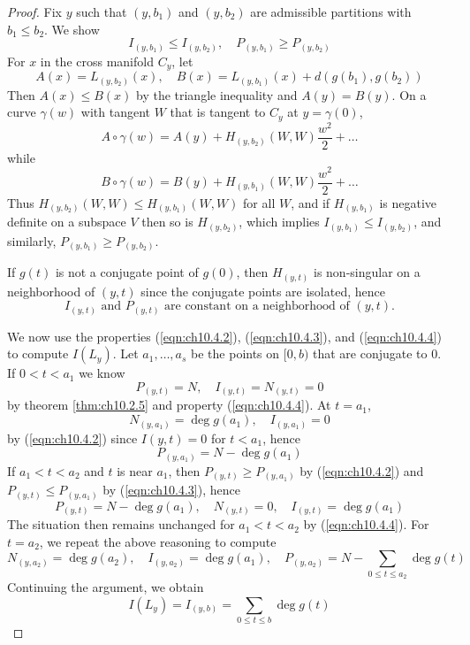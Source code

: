 \documentclass[../main]{subfiles}
\begin{document}
\begin{proof}
Fix $y$ such that $(y,b_1)$ and $(y,b_2)$ are admissible partitions with $b_1\le b_2$. We show
\begin{equation} \tag{12}\label{eqn:ch10.4.3}
I_{(y,b_1)} \le I_{(y,b_2)},
\quad P_{(y,b_1)} \ge P_{(y,b_2)}
\end{equation}
For $x$ in the cross manifold $C_y$, let
\[A(x) = L_{(y,b_2)}(x),
\quad B(x) = L_{(y,b_1)}(x) + d(g(b_1),g(b_2))\]
Then $A(x)\le B(x)$ by the triangle inequality and $A(y)=B(y)$. On a curve $\gamma(w)$ with tangent $W$ that is tangent to $C_y$ at $y=\gamma(0)$,
\[A\circ\gamma(w) = A(y) + H_{(y,b_2)}(W,W)\frac{w^2}{2} + \ldots\]
while
\[B\circ\gamma(w) = B(y) + H_{(y,b_1)}(W,W)\frac{w^2}{2} + \ldots\]
Thus $H_{(y,b_2)}(W,W)\le H_{(y,b_1)}(W,W)$ for all $W$, and if $H_{(y,b_1)}$ is negative definite on a subspace $V$ then so is $H_{(y,b_2)}$, which implies $I_{(y,b_1)}\le I_{(y,b_2)}$, and similarly, $P_{(y,b_1)}\ge P_{(y,b_2)}$.

If $g(t)$ is not a conjugate point of $g(0)$, then $H_{(y,t)}$ is non-singular on a neighborhood of $(y,t)$ since the conjugate points are isolated, hence
\begin{equation}\tag{13} \label{eqn:ch10.4.4}
I_{(y,t)} \text{ and } P_{(y,t)}
\text{ are constant on a neighborhood of } (y,t).
\end{equation}

We now use the properties (\ref{eqn:ch10.4.2}), (\ref{eqn:ch10.4.3}), and (\ref{eqn:ch10.4.4}) to compute $I(L_y)$. Let $a_1,\ldots,a_s$ be the points on $[0,b)$ that are conjugate to 0. If $0<t<a_1$ we know
\[P_{(y,t)} = N,
\quad I_{(y,t)} = N_{(y,t)} = 0\]
by theorem \ref{thm:ch10.2.5} and property (\ref{eqn:ch10.4.4}). At $t=a_1$,
\[N_{(y,a_1)} = \deg g(a_1),
\quad I_{(y,a_1)} = 0\]
by (\ref{eqn:ch10.4.2}) since $I{(y,t)}=0$ for $t<a_1$, hence
\[P_{(y,a_1)} = N - \deg g(a_1)\]
If $a_1<t<a_2$ and $t$ is near $a_1$, then $P_{(y,t)}\ge P_{(y,a_1)}$ by (\ref{eqn:ch10.4.2}) and $P_{(y,t)}\le P_{(y,a_1)}$ by (\ref{eqn:ch10.4.3}), hence
\[P_{(y,t)} = N - \deg g(a_1),
\quad N_{(y,t)} = 0,
\quad I_{(y,t)} = \deg g(a_1)\]
The situation then remains unchanged for $a_1<t<a_2$ by (\ref{eqn:ch10.4.4}). For $t=a_2$, we repeat the above reasoning to compute
\[N_{(y,a_2)} = \deg g(a_2),
\quad I_{(y,a_2)} = \deg g(a_1),
\quad P_{(y,a_2)} = N - \sum_{0\le t\le a_2}\deg g(t)\]
Continuing the argument, we obtain
\[I(L_y) = I_{(y,b)} = \sum_{0\le t\le b}\deg g(t)\]
\end{proof}
\end{document}
